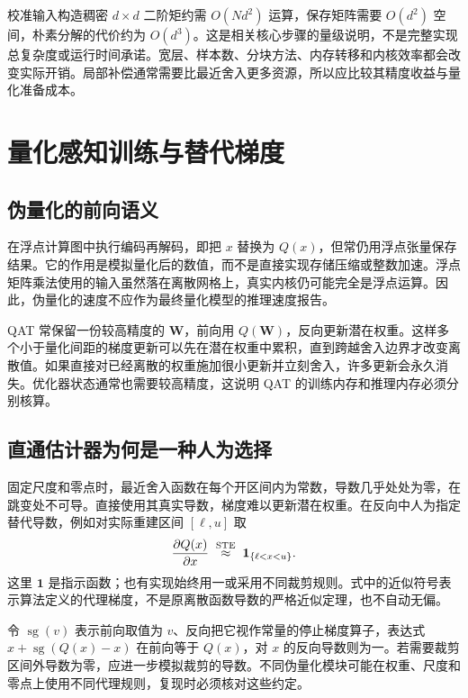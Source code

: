 \documentclass[UTF8,12pt,a4paper,fontset=fandol]{ctexart}
\begin{document}
校准输入构造稠密 $d\times d$ 二阶矩约需 $O(Nd^2)$ 运算，保存矩阵需要 $O(d^2)$ 空间，朴素分解的代价约为 $O(d^3)$。这是相关核心步骤的量级说明，不是完整实现总复杂度或运行时间承诺。宽层、样本数、分块方法、内存转移和内核效率都会改变实际开销。局部补偿通常需要比最近舍入更多资源，所以应比较其精度收益与量化准备成本。

\section{量化感知训练与替代梯度}
\label{sec:quant-qat}

\subsection{伪量化的前向语义}
在浮点计算图中执行编码再解码，即把 $x$ 替换为 $Q(x)$，但常仍用浮点张量保存结果。它的作用是模拟量化后的数值，而不是直接实现存储压缩或整数加速。浮点矩阵乘法使用的输入虽然落在离散网格上，真实内核仍可能完全是浮点运算。因此，伪量化的速度不应作为最终量化模型的推理速度报告。

QAT 常保留一份较高精度的 $\mathbf W$，前向用 $Q(\mathbf W)$，反向更新潜在权重。这样多个小于量化间距的梯度更新可以先在潜在权重中累积，直到跨越舍入边界才改变离散值。如果直接对已经离散的权重施加很小更新并立刻舍入，许多更新会永久消失。优化器状态通常也需要较高精度，这说明 QAT 的训练内存和推理内存必须分别核算。

\subsection{直通估计器为何是一种人为选择}
固定尺度和零点时，最近舍入函数在每个开区间内为常数，导数几乎处处为零，在跳变处不可导。直接使用其真实导数，梯度难以更新潜在权重。在反向中人为指定替代导数，例如对实际重建区间 $[\ell,u]$ 取
\begin{equation}
 \frac{\partial Q(x)}{\partial x}\;\mathrel{\mathop{\approx}^{\rm STE}}\;
 \mathbf 1_{\{\ell<x<u\}}.
 \label{eq:quant-ste}
\end{equation}
这里 $\mathbf 1$ 是指示函数；也有实现始终用一或采用不同裁剪规则。式中的近似符号表示算法定义的代理梯度，不是原离散函数导数的严格近似定理，也不自动无偏。

令 $\operatorname{sg}(v)$ 表示前向取值为 $v$、反向把它视作常量的停止梯度算子，表达式 $x+\operatorname{sg}(Q(x)-x)$ 在前向等于 $Q(x)$，对 $x$ 的反向导数则为一。若需要裁剪区间外导数为零，应进一步模拟裁剪的导数。不同伪量化模块可能在权重、尺度和零点上使用不同代理规则，复现时必须核对这些约定。
\end{document}
